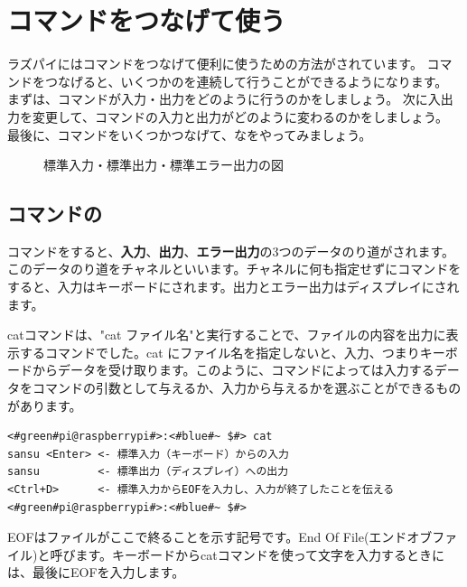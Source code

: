 \documentclass[text03.tex]{subfiles}
\begin{document}
\newpage
\section{コマンドをつなげて使う}
ラズパイにはコマンドをつなげて便利に使うための方法がされています。
コマンドをつなげると、いくつかのを連続して行うことができるようになります。
まずは、コマンドが入力・出力をどのように行うのかをしましょう。
次に入出力を変更して、コマンドの入力と出力がどのように変わるのかをしましょう。
最後に、コマンドをいくつかつなげて、なをやってみましょう。

\begin{figure}[h]
    \centering
    
    \caption{標準入力・標準出力・標準エラー出力の図}
    \label{ch03:stdioerr}
\end{figure}

\subsection{コマンドの}

コマンドをすると、{\bf {}入力}、{\bf {}出力}、{\bf {}エラー出力}の3つのデータのり道がされます。このデータのり道をチャネルといいます。チャネルに何も指定せずにコマンドをすると、入力はキーボードにされます。出力とエラー出力はディスプレイにされます。

catコマンドは、"cat ファイル名"と実行することで、ファイルの内容を出力に表示するコマンドでした。cat にファイル名を指定しないと、入力、つまりキーボードからデータを受け取ります。このように、コマンドによっては入力するデータをコマンドの引数として与えるか、入力から与えるかを選ぶことができるものがあります。

\begin{lstlisting}[caption=catの標準入力・標準出力, label=stdioCat]
<#green#pi@raspberrypi#>:<#blue#~ $#> cat
sansu <Enter> <- 標準入力（キーボード）からの入力
sansu         <- 標準出力（ディスプレイ）への出力
<Ctrl+D>      <- 標準入力からEOFを入力し、入力が終了したことを伝える
<#green#pi@raspberrypi#>:<#blue#~ $#>
\end{lstlisting}
EOFはファイルがここで終ることを示す記号です。End Of File(エンドオブファイル)と呼びます。キーボードからcatコマンドを使って文字を入力するときには、最後にEOFを入力します。
\end{document}
